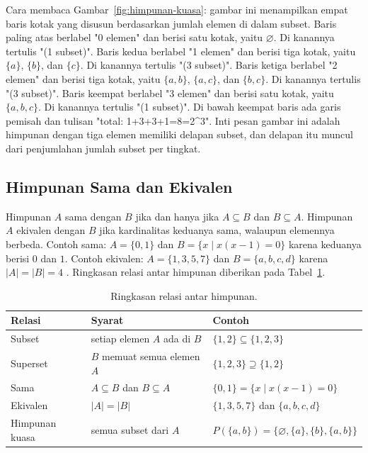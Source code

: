 \documentclass[11pt,a4paper]{article}
\begin{document}
Cara membaca Gambar~\ref{fig:himpunan-kuasa}: gambar ini menampilkan empat baris kotak yang disusun berdasarkan jumlah elemen di dalam subset. Baris paling atas berlabel "0 elemen" dan berisi satu kotak, yaitu $\varnothing$. Di kanannya tertulis "(1 subset)". Baris kedua berlabel "1 elemen" dan berisi tiga kotak, yaitu $\{a\}$, $\{b\}$, dan $\{c\}$. Di kanannya tertulis "(3 subset)". Baris ketiga berlabel "2 elemen" dan berisi tiga kotak, yaitu $\{a,b\}$, $\{a,c\}$, dan $\{b,c\}$. Di kanannya tertulis "(3 subset)". Baris keempat berlabel "3 elemen" dan berisi satu kotak, yaitu $\{a,b,c\}$. Di kanannya tertulis "(1 subset)". Di bawah keempat baris ada garis pemisah dan tulisan "total: 1+3+3+1=8=2^3". Inti pesan gambar ini adalah himpunan dengan tiga elemen memiliki delapan subset, dan delapan itu muncul dari penjumlahan jumlah subset per tingkat.

\subsection{Himpunan Sama dan Ekivalen}

Himpunan $A$ sama dengan $B$ jika dan hanya jika $A \subseteq B$ dan $B \subseteq A$. Himpunan $A$ ekivalen dengan $B$ jika kardinalitas keduanya sama, walaupun elemennya berbeda. Contoh sama: $A=\{0,1\}$ dan $B=\{x \mid x(x-1)=0\}$ karena keduanya berisi $0$ dan $1$. Contoh ekivalen: $A=\{1,3,5,7\}$ dan $B=\{a,b,c,d\}$ karena $|A|=|B|=4$ \cite{rosen}. Ringkasan relasi antar himpunan diberikan pada Tabel~\ref{tab:relasi-himpunan}.

\begin{table}[H]
	\centering
	\caption{Ringkasan relasi antar himpunan.}
	\label{tab:relasi-himpunan}
	\small
	\begin{tabularx}{\textwidth}{l X X}
		\toprule
		Relasi & Syarat & Contoh \\
		\midrule
		Subset & setiap elemen $A$ ada di $B$ & $\{1,2\} \subseteq \{1,2,3\}$ \\
		Superset & $B$ memuat semua elemen $A$ & $\{1,2,3\} \supseteq \{1,2\}$ \\
		Sama & $A \subseteq B$ dan $B \subseteq A$ & $\{0,1\}=\{x \mid x(x-1)=0\}$ \\
		Ekivalen & $|A|=|B|$ & $\{1,3,5,7\}$ dan $\{a,b,c,d\}$ \\
		Himpunan kuasa & semua subset dari $A$ & $P(\{a,b\})=\{\varnothing,\{a\},\{b\},\{a,b\}\}$ \\
		\bottomrule
	\end{tabularx}
\end{table}
\end{document}
